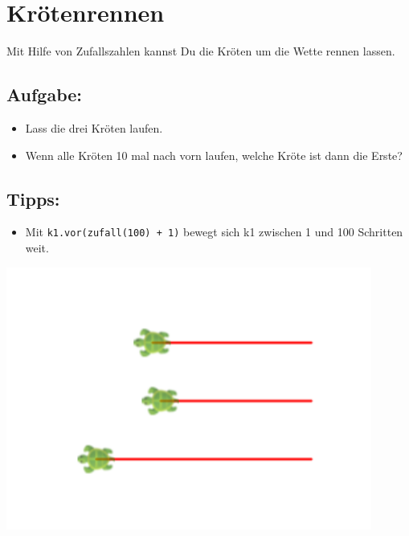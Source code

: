 \chapter{Krötenrennen}
\begin{multicols}{2}
Mit Hilfe von Zufallszahlen kannst Du die Kröten um die Wette rennen lassen.
\section*{\color{BrickRed}Aufgabe:}


\begin{itemize}

\item {Lass die drei Kröten laufen.}
\item {Wenn alle Kröten 10 mal nach vorn laufen, welche Kröte ist dann die Erste?}

\end{itemize}


\section*{\color{OliveGreen}Tipps:}


\begin{itemize}

\item {Mit \lstinline{k1.vor(zufall(100) + 1)} bewegt sich k1 zwischen 1 und 100 Schritten weit.}

\end{itemize}



\columnbreak

\begin{center}
\includegraphics[width=12.0cm]{../img/race.png}
\end{center}

\end{multicols}

